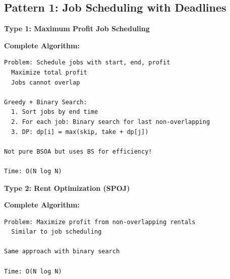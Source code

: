 \documentclass[11pt,a4paper,oneside]{book}
\begin{document}
\subsection{Pattern 1: Job Scheduling with Deadlines}

\begin{tcolorbox}[
    enhanced,breakable,
    colback=successgreen!10,
    colframe=successgreen,
    boxrule=1.5pt,
    arc=3mm,
    title=\textbf{Complete Job Scheduling Algorithms}
]
\textbf{Type 1: Maximum Profit Job Scheduling}

\textbf{Complete Algorithm:}
\begin{verbatim}
Problem: Schedule jobs with start, end, profit
  Maximize total profit
  Jobs cannot overlap

Greedy + Binary Search:
  1. Sort jobs by end time
  2. For each job: Binary search for last non-overlapping
  3. DP: dp[i] = max(skip, take + dp[j])

Not pure BSOA but uses BS for efficiency!

Time: O(N log N)
\end{verbatim}

\textbf{Type 2: Rent Optimization (SPOJ)}

\textbf{Complete Algorithm:}
\begin{verbatim}
Problem: Maximize profit from non-overlapping rentals
  Similar to job scheduling
  
Same approach with binary search

Time: O(N log N)
\end{verbatim}
\end{tcolorbox}
\end{document}
